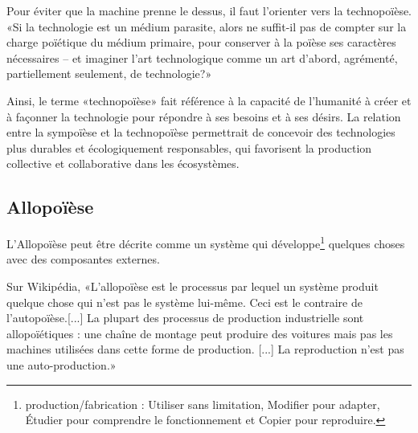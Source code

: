 Pour éviter que la machine prenne le dessus, il faut l'orienter vers la technopoïèse. «Si la technologie est un médium parasite, alors ne suffit-il pas de compter sur la charge poïétique du médium primaire, pour conserver à la poïèse ses caractères nécessaires – et imaginer l’art technologique comme un art d’abord, agrémenté, partiellement seulement, de technologie?»~\cite{artiste_techno_conf_2012} %


Ainsi, le terme «technopoïèse» fait référence à la capacité de l'humanité à créer et à façonner la technologie pour répondre à ses besoins et à ses désirs. La relation entre la sympoïèse et la technopoïèse permettrait de concevoir des technologies plus durables et écologiquement responsables, qui favorisent la production collective et collaborative dans les écosystèmes. 

\subsection{Allopoïèse}

L'Allopoïèse peut être décrite comme un système qui développe\footnote{production/fabrication : Utiliser sans limitation, Modifier pour adapter, Étudier pour comprendre le fonctionnement et Copier pour reproduire.} quelques choses avec des composantes externes.

Sur Wikipédia, «L'allopoïèse est le processus par lequel un système produit quelque chose qui n'est pas le système lui-même. Ceci est le contraire de l'autopoïèse.[...] La plupart des processus de production industrielle sont allopoïétiques : une chaîne de montage peut produire des voitures mais pas les machines utilisées dans cette forme de production. [...] La reproduction n'est pas une auto-production.»~\cite{wiki_allopoiesis_2018}~\cite{vuc_allopoiesis_2018}

